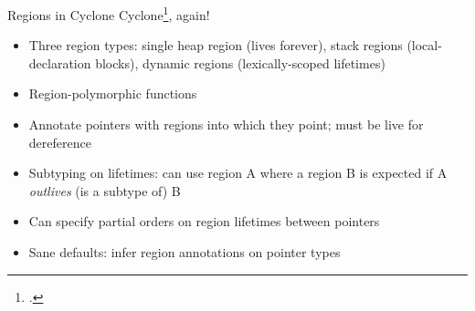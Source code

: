 \documentclass[aspectratio=169]{beamer}
\begin{document}
\begin{frame}{Regions in Cyclone}
    Cyclone\footcite{grossman_region-based_2002}, again!
    \begin{itemize}[<+->]
        \item Three region types: single heap region (lives forever), stack regions (local-declaration blocks), dynamic regions (lexically-scoped lifetimes)
        \item Region-polymorphic functions
        \item Annotate pointers with regions into which they point; must be live for dereference
        \item Subtyping on lifetimes: can use region A where a region B is expected if A \emph{outlives} (is a subtype of) B
        \item Can specify partial orders on region lifetimes between pointers
        \item Sane defaults: infer region annotations on pointer types  %
    \end{itemize}
    \vspace{0.1in}
\end{frame}
\end{document}

